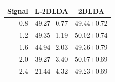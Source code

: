 \begin{tabular}{rcc}
\toprule
Signal & L-2DLDA & 2DLDA \\
\midrule
0.8 & 49.27$\pm$0.77 & 49.44$\pm$0.72 \\
1.2 & 49.35$\pm$1.19 & 50.02$\pm$0.74 \\
1.6 & 44.94$\pm$2.03 & 49.36$\pm$0.79 \\
2.0 & 39.27$\pm$3.40 & 50.07$\pm$0.69 \\
2.4 & 21.44$\pm$4.32 & 49.23$\pm$0.69 \\
\bottomrule
\end{tabular}
